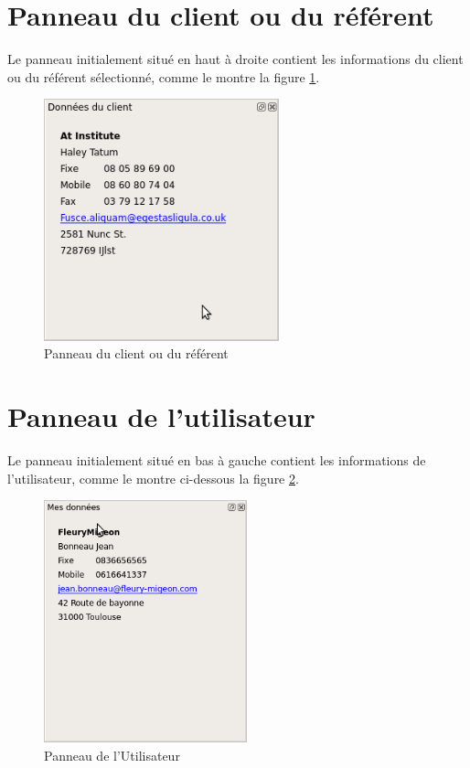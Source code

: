 \section{Panneau du client ou du référent}
Le panneau initialement situé en haut à droite contient les informations du client ou du référent sélectionné, comme le montre la figure
\ref{fig:dockClient}.

\begin{figure}[H]
	\centering
	\includegraphics[height=7cm]{screens/dockClient.png}
	\caption{Panneau du client ou du référent}
	\label{fig:dockClient}
\end{figure}

\section{Panneau de l'utilisateur}
Le panneau initialement situé en bas à gauche contient les informations de l'utilisateur, comme le montre ci-dessous la figure
\ref{fig:dockUtilisateur}.

\begin{figure}[H]
	\centering
	\includegraphics[height=7cm]{screens/dockUtilisateur.png}
	\caption{Panneau de l'Utilisateur}
	\label{fig:dockUtilisateur}
\end{figure}
